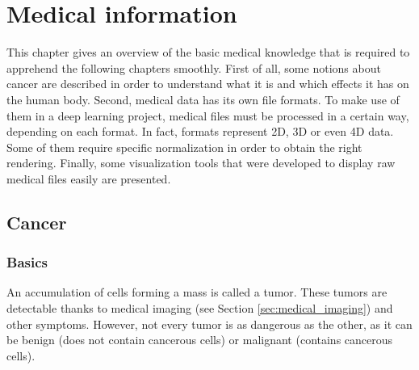 
\chapter{Medical information}
\label{ch:medical}
\setlength{\marginparwidth}{3cm}\leavevmode {}This chapter gives an overview of the basic medical knowledge that is required to apprehend the following chapters smoothly. First of all, some notions about cancer are described in order to understand what it is and which effects it has on the human body. Second, medical data has its own file formats. To make use of them in a deep learning project, medical files must be processed in a certain way, depending on each format. In fact, formats represent 2D, 3D or even 4D data. Some of them require specific normalization in order to obtain the right rendering. Finally, some visualization tools that were developed to display raw medical files easily are presented. 


\section{Cancer}
\subsection{Basics}
\setlength{\marginparwidth}{3cm}\leavevmode {}An accumulation of cells forming a mass is called a tumor. These tumors are detectable thanks to medical imaging (see Section \ref{sec:medical_imaging}) and other symptoms. However, not every tumor is as dangerous as the other, as it can be benign (does not contain cancerous cells) or malignant (contains cancerous cells).

